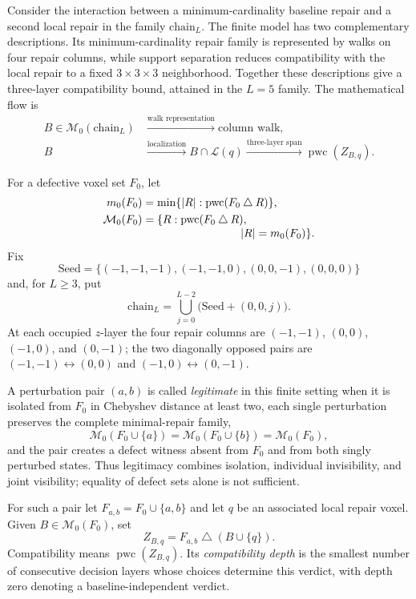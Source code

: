 \documentclass[11pt]{article}
\newcommand{\pwc}{\operatorname{pwc}}
\begin{document}
Consider the interaction between a minimum-cardinality baseline repair and a
second local repair in the family $\mathrm{chain}_L$.  The finite model has two
complementary descriptions.  Its minimum-cardinality repair family is
represented by walks on four repair columns, while support separation reduces
compatibility with the local repair to a fixed $3\times3\times3$ neighborhood.
Together these descriptions give a three-layer compatibility bound, attained
in the $L=5$ family.  The mathematical flow is
\[
\begin{aligned}
 B\in\mathcal M_0(\mathrm{chain}_L)
 &\xrightarrow{\text{walk representation}}\text{column walk},\\
 B&\xrightarrow{\text{localization}}B\cap\mathcal L(q)
   \xrightarrow{\text{three-layer span}}\pwc(Z_{B,q}).
\end{aligned}
\]

For a defective voxel set $F_0$, let
\[
\begin{aligned}
 m_0(F_0)&=\min\{\lvert R\rvert:\pwc(F_0\mathbin{\triangle}R)\},\\
 \mathcal M_0(F_0)&=
 \{R:\pwc(F_0\mathbin{\triangle}R),\\[-1mm]
 &\hspace{31mm}\lvert R\rvert=m_0(F_0)\}.
\end{aligned}
\]
Fix
\[
 \mathrm{Seed}=\{(-1,-1,-1),(-1,-1,0),(0,0,-1),(0,0,0)\}
\]
and, for $L\ge3$, put
\[
 \mathrm{chain}_L=\bigcup_{j=0}^{L-2}
   \bigl(\mathrm{Seed}+(0,0,j)\bigr).
\]
At each occupied $z$-layer the four repair columns are
$(-1,-1)$, $(0,0)$, $(-1,0)$, and $(0,-1)$; the two diagonally opposed pairs
are $(-1,-1)\leftrightarrow(0,0)$ and
$(-1,0)\leftrightarrow(0,-1)$.

A perturbation pair $(a,b)$ is called \emph{legitimate} in this finite setting
when it is isolated from $F_0$ in Chebyshev distance at least two, each single
perturbation preserves the complete minimal-repair family,
\[
 \mathcal M_0(F_0\cup\{a\})=
 \mathcal M_0(F_0\cup\{b\})=\mathcal M_0(F_0),
\]
and the pair creates a defect witness absent from $F_0$ and from both singly
perturbed states.  Thus legitimacy combines isolation, individual
invisibility, and joint visibility; equality of defect sets alone is not
sufficient.

For such a pair let $F_{a,b}=F_0\cup\{a,b\}$ and let $q$ be an associated
local repair voxel.  Given $B\in\mathcal M_0(F_0)$, set
\[
 Z_{B,q}=F_{a,b}\mathbin{\triangle}(B\cup\{q\}).
\]
Compatibility means $\pwc(Z_{B,q})$.  Its \emph{compatibility depth} is the
smallest number of consecutive decision layers whose choices determine this
verdict, with depth zero denoting a baseline-independent verdict.
\end{document}

